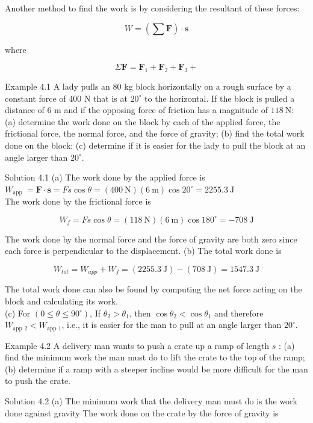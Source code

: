 \documentclass[10pt]{article}
\numberwithin{equation}{section}
\begin{document}
Another method to find the work is by considering the resultant of these forces:

$$
W=\left(\sum \mathbf{F}\right) \cdot \mathbf{s}
$$

where

$$
\Sigma \mathbf{F}=\mathbf{F}_{1}+\mathbf{F}_{2}+\mathbf{F}_{3}+
$$

Example 4.1 A lady pulls an 80 kg block horizontally on a rough surface by a constant force of 400 N that is at $20^{\circ}$ to the horizontal. If the block is pulled a distance of 6 m and if the opposing force of friction has a magnitude of $118 \mathrm{~N}:$ (a) determine the work done on the block by each of the applied force, the frictional force, the normal force, and the force of gravity; (b) find the total work done on the block; (c) determine if it is easier for the lady to pull the block at an angle larger than $20^{\circ}$.

Solution 4.1 (a) The work done by the applied force is\\
$W_{\text {app }}=\mathbf{F} \cdot \mathbf{s}=F s \cos \theta=(400 \mathrm{~N})(6 \mathrm{~m}) \cos 20^{\circ}=2255.3 \mathrm{~J}$\\
The work done by the frictional force is

$$
W_{f}=F s \cos \theta=(118 \mathrm{~N})(6 \mathrm{~m}) \cos 180^{\circ}=-708 \mathrm{~J}
$$

The work done by the normal force and the force of gravity are both zero since each force is perpendicular to the displacement. (b) The total work done is

$$
W_{t o t}=W_{a p p}+W_{f}=(2255.3 \mathrm{~J})-(708 \mathrm{~J})=1547.3 \mathrm{~J}
$$

The total work done can also be found by computing the net force acting on the block and calculating its work.\\
(c) For $\left(0 \leq \theta \leq 90^{\circ}\right)$, If $\theta_{2}>\theta_{1}$, then $\cos \theta_{2}<\cos \theta_{1}$ and therefore $W_{\text {app } 2}<W_{\text {app } 1}$, i.e., it is easier for the man to pull at an angle larger than $20^{\circ}$.

Example 4.2 A delivery man wants to push a crate up a ramp of length $s$ : (a) find the minimum work the man must do to lift the crate to the top of the ramp; (b) determine if a ramp with a steeper incline would be more difficult for the man to push the crate.

Solution 4.2 (a) The minimum work that the delivery man must do is the work done against gravity The work done on the crate by the force of gravity is
\end{document}
